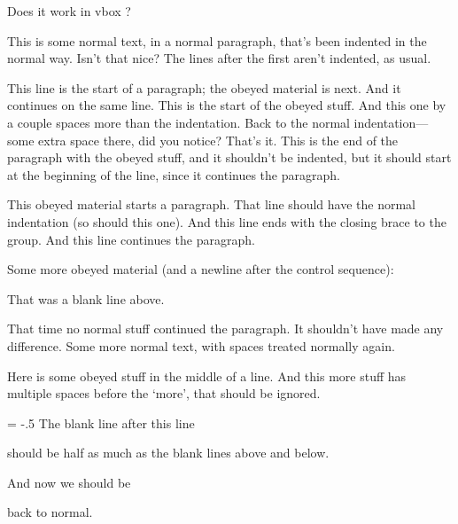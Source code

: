 \ifx\eplain\undefined  \fi

\vbox{\obeywhitespace Does it work in  vbox    ?}

This is some normal text, in a normal paragraph, that's been indented in
the normal way.  Isn't that nice? The lines after the first aren't
indented, as usual.

This line is the start of a paragraph; the obeyed material is next.  And
it continues on the same line.
{\obeywhitespace This is   the   start of the obeyed stuff.
  And this one by a couple spaces more than the indentation.
Back to the normal indentation---   some extra space there, did you notice?
That's   it.
}
This is the end of the paragraph with the obeyed stuff, and it shouldn't
be indented, but it should start at the beginning of the line, since it
continues the paragraph.

{\obeywhitespace This  obeyed  material starts a paragraph.
That line should have the normal   indentation (so should this one).
And this line ends with the closing   brace to the group.}
And this line continues the paragraph.

{\obeywhitespace
Some   more   obeyed material (and a newline after the control sequence):

That was a   blank   line above.
}

That time no normal stuff continued the paragraph. It shouldn't have
made any difference.
Some more normal text, with spaces   treated     normally again.

Here is some {\obeywhitespace obeyed   stuff} in the middle of a line.
And this {\obeywhitespace       more stuff} has multiple spaces before
the `more', that should be ignored.

{\blanklineskipamount = -.5\baselineskip
\obeywhitespace The blank line after this line

should be half as much as the blank lines above and below.
}

{\obeywhitespace And now we should be

back to normal.}

\bye
